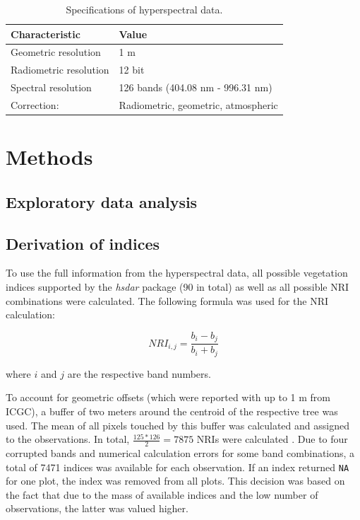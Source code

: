 \documentclass[review]{elsarticle}
\begin{document}
\begin{table}[b!]
\centering
\caption[t]{Specifications of hyperspectral data.}
\begingroup\footnotesize
\begin{tabular}{ll}
	\\
	Characteristic         & Value                               \\
	\hline
	Geometric resolution   & 1 m                                 \\
	Radiometric resolution & 12 bit                              \\
	Spectral resolution    & 126 bands (404.08 nm - 996.31 nm)   \\
	Correction:            & Radiometric, geometric, atmospheric
\end{tabular}
\endgroup
\label{tab:hyperparameter_limits}
\end{table}






\section{Methods}

\subsection{Exploratory data analysis}

\subsection{Derivation of indices}
\noindent To use the full information from the hyperspectral data, all possible vegetation indices supported by the \textit{hsdar} package (90 in total) as well as all possible \ac{NRI} combinations were calculated.
The following formula was used for the NRI calculation:

\begin{equation}
	NRI_{i,j} = \frac{b_{i} - b_{j}}{b_{i} + b_{j}}
\end{equation}

\noindent
where $i$ and $j$ are the respective band numbers.

\bigbreak

\noindent To account for geometric offsets (which were reported with up to 1 m from \ac{ICGC}), a buffer of two meters around the centroid of the respective tree was used.
The mean of all pixels touched by this buffer was calculated and assigned to the observations.
In total, $\frac{125*126}{2} = 7875$ NRIs were calculated .
Due to four corrupted bands and numerical calculation errors for some band combinations, a total of 7471 indices was available for each observation.
If an index returned \texttt{NA} for one plot, the index was removed from all plots.
This decision was based on the fact that due to the mass of available indices and the low number of observations, the latter was valued higher.
\end{document}
